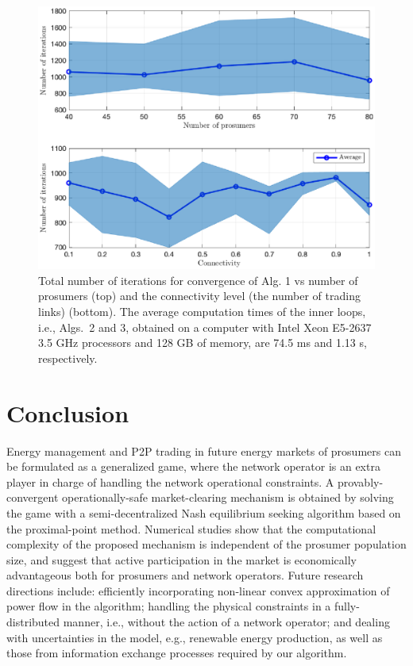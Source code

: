 \documentclass{IEEEtran}  %
\newcommand{\0}{\mathbf{0}}
\newcommand{\1}{\mathbf{1}}
\begin{document}
\begin{figure}[t]
	\centering
	\includegraphics[width=0.9\linewidth]{figures/simEF2.eps}
	\caption{Total number of iterations for convergence of Alg. 1 vs number of prosumers (top) and the connectivity level (the number of trading links) (bottom). {The average computation times of the inner loops, i.e., Algs.~2 and 3, obtained on a computer with Intel Xeon E5-2637 3.5 GHz processors and 128 GB of memory, are 74.5 ms and 1.13 s, respectively.} 
	}
	\label{fig:simE}
\end{figure}

\section{Conclusion}
Energy management and P2P trading in future energy markets of prosumers can be formulated as a generalized game, where the network operator is an extra player in charge of handling the network operational constraints. A provably-convergent operationally-safe market-clearing mechanism is obtained by solving the game with a semi-decentralized Nash equilibrium seeking algorithm based on the proximal-point method.    
%
Numerical studies show that the computational complexity of the proposed mechanism is independent of the prosumer population size, and suggest that active participation in the market is economically advantageous both for prosumers and network operators.
%
Future research directions include: efficiently incorporating non-linear convex approximation of power flow in the algorithm; handling the physical constraints in a fully-distributed manner, i.e., without the action of a network operator; and dealing with uncertainties in the model, e.g., renewable energy production, as well as those from information exchange processes required by our algorithm.




%
\end{document}
